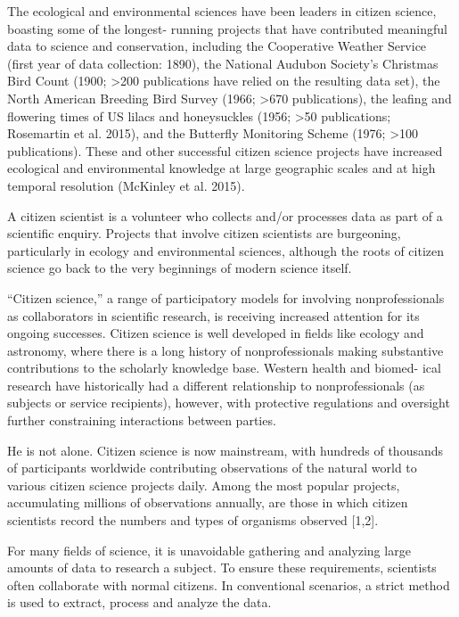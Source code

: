 The ecological and environmental sciences have been leaders in citizen science, boasting some of the longest- running projects that have contributed meaningful data to science and conservation, including the Cooperative Weather Service (first year of data collection: 1890), the National Audubon Society’s Christmas Bird Count (1900; >200 publications have relied on the resulting data set), the North American Breeding Bird Survey (1966; >670 publications), the leafing and flowering times of US lilacs and honeysuckles (1956; >50 publications; Rosemartin et al. 2015), and the Butterfly Monitoring Scheme (1976; >100 publications). These and other successful citizen science projects have increased ecological and environmental knowledge at large geographic scales and at high temporal resolution (McKinley et al. 2015).

A citizen scientist is a volunteer who collects and/or processes data as part of a scientific enquiry. Projects that involve citizen scientists are burgeoning, particularly in ecology and environmental sciences, although the roots of citizen science go back to the very beginnings of modern science itself.

“Citizen science,” a range of participatory models for involving nonprofessionals as collaborators in scientific research, is receiving increased attention for its ongoing successes. Citizen science is well developed in fields like ecology and astronomy, where there is a long history of nonprofessionals making substantive contributions to the scholarly knowledge base. Western health and biomed- ical research have historically had a different relationship to nonprofessionals (as subjects or service recipients), however, with protective regulations and oversight further constraining interactions between parties. 

He is not alone. Citizen science is now mainstream, with hundreds of thousands of participants worldwide contributing observations of the natural world to various citizen science projects daily. Among the most popular projects, accumulating millions of observations annually, are those in which citizen scientists record the numbers and types of organisms observed [1,2].

For many fields of science, it is unavoidable gathering and analyzing large amounts of data to research a subject. To ensure these requirements, scientists often collaborate with normal citizens. 
In conventional scenarios, a strict method is used to extract, process and analyze the data.

